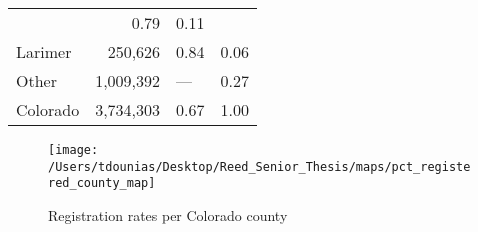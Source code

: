 \documentclass[12pt,twoside]{reedthesis}
\begin{document}
\begin{longtable}[]{@{}lrlr@{}}
\begin{minipage}[t]{0.23\columnwidth}
  \end{minipage} & \begin{minipage}[t]{0.30\columnwidth}\raggedright\strut
  0.79\strut
  \end{minipage} & \begin{minipage}[t]{0.26\columnwidth}\raggedleft\strut
  0.11\strut
  \end{minipage}\tabularnewline
  \begin{minipage}[t]{0.10\columnwidth}\raggedright\strut
  Larimer\strut
  \end{minipage} & \begin{minipage}[t]{0.23\columnwidth}\raggedleft\strut
  250,626\strut
  \end{minipage} & \begin{minipage}[t]{0.30\columnwidth}\raggedright\strut
  0.84\strut
  \end{minipage} & \begin{minipage}[t]{0.26\columnwidth}\raggedleft\strut
  0.06\strut
  \end{minipage}\tabularnewline
  \begin{minipage}[t]{0.10\columnwidth}\raggedright\strut
  Other\strut
  \end{minipage} & \begin{minipage}[t]{0.23\columnwidth}\raggedleft\strut
  1,009,392\strut
  \end{minipage} & \begin{minipage}[t]{0.30\columnwidth}\raggedright\strut
  ---\strut
  \end{minipage} & \begin{minipage}[t]{0.26\columnwidth}\raggedleft\strut
  0.27\strut
  \end{minipage}\tabularnewline
  \begin{minipage}[t]{0.10\columnwidth}\raggedright\strut
  Colorado\strut
  \end{minipage} & \begin{minipage}[t]{0.23\columnwidth}\raggedleft\strut
  3,734,303\strut
  \end{minipage} & \begin{minipage}[t]{0.30\columnwidth}\raggedright\strut
  0.67\strut
  \end{minipage} & \begin{minipage}[t]{0.26\columnwidth}\raggedleft\strut
  1.00\strut
  \end{minipage}\tabularnewline
  \bottomrule
  \end{longtable}
  
  \begin{figure}
  
  {\centering \texttt{[image: /Users/tdounias/Desktop/Reed\_Senior\_Thesis/maps/pct\_registered\_county\_map]} 
  
  }
  
  \caption[Registration rates per Colorado county]{Registration rates per Colorado county}\label{fig:reg per county map}
  \end{figure}
  
\end{document}
